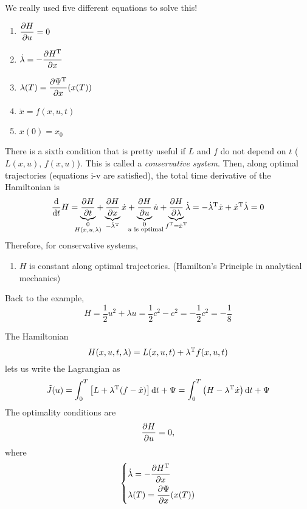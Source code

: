 We really used five different equations to solve this!
\begin{enumerate}[label=\roman*)]
\item $\displaystyle \frac{\partial H}{\partial u} = 0$
\item $\displaystyle \dot\lambda = - \frac{\partial H^\text{T}}{\partial x}$
\item $\displaystyle \lambda(T) = \frac{\partial \Psi^\text{T}}{\partial x}(x(T))$
\item $\dot x = f(x,u,t)$
\item $x(0) = x_0$
\end{enumerate}
There is a sixth condition that is pretty useful if $L$ and $f$ do not depend on $t$ ($L(x,u)$, $f(x,u)$). This is called a \emph{conservative system}. Then, along optimal trajectories (equations i-v are satisfied), the total time derivative of the Hamiltonian is
\[
  \frac{\dif}{\dif t} H = \underbrace{\pder{H}{t}}_{\mathclap{\substack{0\\ H(x,u,\lambda)}}} + \underbrace{\pder{H}{x}}_{-\dot\lambda\trans} \dot x + \underbrace{\pder{H}{u}}_{\mathclap{\substack{0\\ \text{ $u$ is optimal}}}} \dot u + \underbrace{\pder{H}{\lambda}}_{\mathclap{f\trans=\dot x\trans}} \dot\lambda
  = -\dot\lambda\trans \dot x + \dot x\trans \dot\lambda = 0
\]
Therefore, for conservative systems,
\begin{enumerate}[resume*]
\item $H$ is constant along optimal trajectories. (Hamilton's Principle in analytical mechanics)
\end{enumerate}
Back to the example,
\[ H = \frac12 u^2 + \lambda u = \frac12 c^2 - c^2 = -\frac12 c^2 = -\frac18 \]

The Hamiltonian
\[ H(x,u,t,\lambda) = L(x,u,t) + \lambda^\text{T} f(x,u,t) \]
lets us write the Lagrangian as
\[ \tilde J(u) = \int_0^T \big[ L + \lambda^\text{T}(f-\dot x) \big] \mathop{}\!\mathrm{d} t + \Psi = \int_0^T \big(H - \lambda^\text{T} \dot x \big) \mathop{}\!\mathrm{d} t + \Psi \]
The optimality conditions are
\begin{gather}
  \frac{\partial H}{\partial u} = 0,
  \label{eq:Hoptcond}
\end{gather}
where
\begin{gather}
  \begin{dcases}
    \dot\lambda = -\frac{\partial H^\text{T}}{\partial x} \\
    \lambda(T) = \frac{\partial \Psi}{\partial x}(x(T))
  \end{dcases}
  \label{eq:Hoptcond2}
\end{gather}

